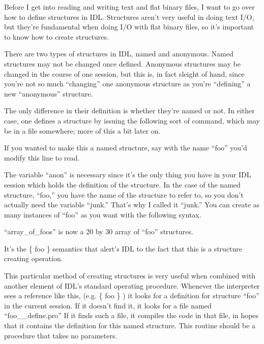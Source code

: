   Before I get into reading and writing text and flat binary files, I
  want to go over how to define structures in IDL. Structures aren't
  very useful in doing text I/O, but they're fundamental when doing
  I/O with flat binary files, so it's important to know how to create
  structures.

  There are two types of structures in IDL, named and anonymous. Named
  structures may not be changed once defined. Anonymous structures
  may be changed in the course of one session, but this is, in fact
  sleight of hand, since you're not so much ``changing'' one anonymous
  structure as you're ``defining'' a new ``anonymous'' structure.

  The only difference in their definition is whether they're named or
  not. In either case, one defines a structure by issuing the
  following sort of command, which may be in a file somewhere; more of
  this a bit later on.


   If you wanted to make this a named structure, say with the name
  ``foo'' you'd modify this line to read.


   The variable ``anon'' is necessary since it's the only thing you
  have in your IDL session which holds the definition of the
  structure. In the case of the named structure, ``foo,'' you have the
  name of the structure to refer to, so you don't actually need the
  variable ``junk.'' That's why I called it ``junk.'' You can create
  as many instances of ``foo'' as you want with the following syntax.


   ``array\_of\_foos'' is now a 20 by 30 array of ``foo'' structures.

  It's the \{ foo \} semantics that alert's IDL to the fact that this
  is a structure creating operation.

   This particular method of creating structures is very useful when
  combined with another element of IDL's standard operating
  procedure. Whenever the interpreter sees a reference like this,
  (e.g. \{ foo \} ) it looks for a definition for structure ``foo'' in
  the current session. If it doesn't find it, it looks for a file
  named ``foo\_\_define.pro'' If it finds such a file, it compiles the
  code in that file, in hopes that it contains the definition for this
  named structure. This routine should be a procedure that takes no
  parameters.

